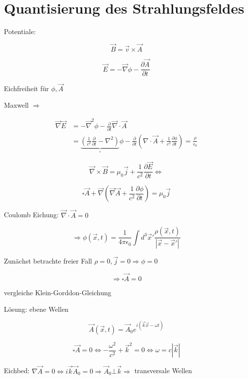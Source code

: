 


\tableofcontents
\setcounter{chapter}{6}
\chapter{Quantisierung des Strahlungsfeldes}

Potentiale:

\[\vec B = \vec v \times \vec A\]

\[\vec E = -\vec \nabla \phi - \frac{\partial \vec A}{\partial t}\]

Eichfreiheit für \(\phi,\vec A\)

Maxwell \(\Rightarrow \)

\begin{align}
\vec \nabla \vec E &= - \vec \nabla^2\phi - \frac{\partial}{\partial t}\vec \nabla\cdot\vec A\\
&= \underbrace{(\frac{1}{c^2}\frac{\partial}{\partial t} - \nabla^2)}_{\square}\phi - \frac{\partial}{\partial t}(\nabla\cdot\vec A + \frac{1}{c^2}\frac{\partial\phi}{\partial t}) = \frac{\rho}{\epsilon_0}
\end{align}

\[\vec \nabla\times\vec B = \mu_0\vec j + \frac{1}{c^2}\frac{\partial\vec E}{\partial t} \Leftrightarrow  \]

\[\square \vec A + \vec\nabla(\vec\nabla\vec A + \frac{1}{c^2} \frac{\partial\phi}{\partial t}) = \mu_0 \vec j\]


Coulomb Eichung: \(\vec \nabla\cdot\vec A = 0\)

\[\Rightarrow \phi(\vec x,t) = \frac{1}{4\pi\epsilon_0}\int d^3\vec x' \frac{\rho(\vec x, t)}{|\vec x - \vec x'|}\]


Zunächst betrachte freier Fall \(\rho =0,\vec j = 0\Rightarrow \phi=0 \)

\[\Rightarrow  \boxed{\square \vec A = 0} \]

vergleiche Klein-Gorddon-Gleichung

Lösung: ebene Wellen

\[\vec A(\vec x,t) = \vec A_0 e^{i(\vec k\vec x - \omega t)}\]


\[\square \vec A = 0 \Leftrightarrow  -\frac{\omega^2}{c^2}+\vec k^2 = 0\Leftrightarrow \omega = c|\vec k| \]


Eichbed: \(\nabla\vec A = 0 \Leftrightarrow i\vec k\vec A_0 = 0 \Rightarrow \vec A_0 \bot \vec k \Rightarrow  \) transversale Wellen

